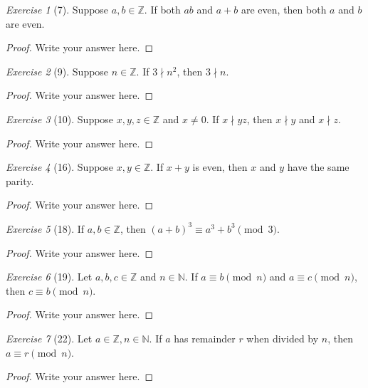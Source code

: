 \documentclass[12pt]{amsart}
\theoremstyle{remark}
\newtheorem*{exercise}{Exercise}%
\def\NN{\ensuremath{\mathbb N}}
\def\ZZ{\ensuremath{\mathbb Z}}
\theoremstyle{mycomment}
\begin{document}
\begin{exercise}[7] Suppose $a,b\in\ZZ$. If both $ab$ and $a+b$ are even, then both $a$ and $b$ are even.
\begin{proof}
Write your answer here.
\end{proof}
\end{exercise}

\begin{exercise}[9] Suppose $n\in\ZZ$. If $3\nmid n^{2}$, then $3\nmid n$. %
\begin{proof}
Write your answer here.
\end{proof}
\end{exercise}

\begin{exercise}[10] Suppose $x,y,z\in\ZZ$ and $x\ne 0$. %
If $x\nmid yz$, then $x\nmid y$ and $x\nmid z$.
\begin{proof}
Write your answer here.
\end{proof}
\end{exercise}

\begin{exercise}[16] Suppose $x,y\in\ZZ$. If $x+y$ is even, then $x$ and $y$ have the same parity.
\begin{proof}
Write your answer here.
\end{proof}
\end{exercise}

\begin{exercise}[18] If $a,b\in\ZZ$, then $(a+b)^{3}\equiv a^{3}+b^{3}\pmod 3$. %
\begin{proof}
Write your answer here.
\end{proof}
\end{exercise}

\begin{exercise}[19] Let $a,b,c\in\ZZ$ and $n\in\NN$. If $a\equiv b\pmod n$ and $a\equiv c\pmod n$, then $c\equiv b\pmod n$.
\begin{proof}
Write your answer here.
\end{proof}
\end{exercise}

\begin{exercise}[22] Let $a\in\ZZ, n\in\NN$. If $a$ has remainder $r$ when divided by $n$, then $a\equiv r\pmod n$.
\begin{proof}
Write your answer here.
\end{proof}
\end{exercise}
\end{document}
